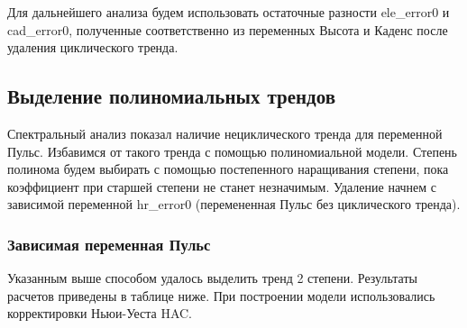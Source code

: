 \documentclass[a4paper,12pt]{article}
\begin{document}
Для дальнейшего анализа будем использовать остаточные разности ele\_error0 и cad\_error0, полученные соответственно из переменных Высота и Каденс после удаления циклического тренда.

\subsection{Выделение полиномиальных трендов}
Спектральный анализ показал наличие нециклического тренда для переменной Пульс. Избавимся от такого тренда с помощью полиномиальной модели. Степень полинома будем выбирать с помощью постепенного наращивания степени, пока коэффициент при старшей степени не станет незначимым. Удаление начнем с зависимой переменной hr\_error0 (перемененная Пульс без циклического тренда).

\subsubsection{Зависимая переменная Пульс}
Указанным выше способом удалось выделить тренд 2 степени. Результаты расчетов приведены в таблице ниже. При построении модели использовались корректировки Ньюи-Уеста HAC.
\end{document}
